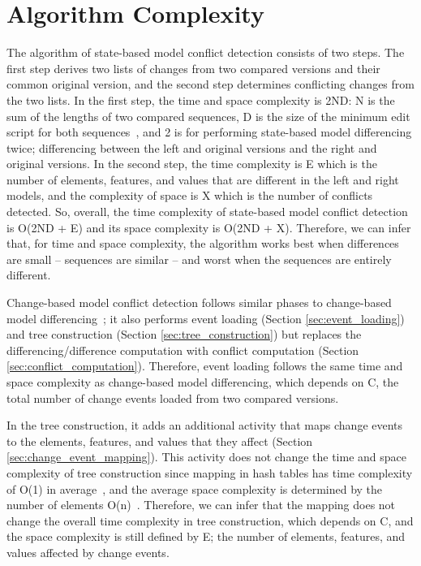 \section{Algorithm Complexity}
\label{sec:conflict_algorithm_complexity}
The algorithm of state-based model conflict detection consists of two steps. The first step derives two lists of changes from two compared versions and their common original version, and the second step determines conflicting changes from the two lists. In the first step, the time and space complexity is \textsf{2ND}: \textsf{N} is the sum of the lengths of two compared sequences, \textsf{D} is the size of the minimum edit script for both sequences~\cite{DBLP:journals/algorithmica/Meyers86}, and \textsf{2} is for performing state-based model differencing twice; differencing between the left and original versions and the right and original versions. In the second step, the time complexity is \textsf{E} which is the number of elements, features, and values that are different in the left and right models, and the complexity of space is \textsf{X} which is the number of conflicts detected. So, overall, the time complexity of state-based model conflict detection is \textsf{O}(\textsf{2ND} + \textsf{E}) and its space complexity is \textsf{O}(\textsf{2ND} + \textsf{X)}. Therefore, we can infer that, for time and space complexity, the algorithm works best when differences are small -- sequences are similar -- and worst when the sequences are entirely different.

Change-based model conflict detection follows similar phases to change-based model differencing~\cite{yohannis2019efficient}; it also performs event loading (Section \ref{sec:event_loading}) and tree construction (Section \ref{sec:tree_construction}) but replaces the differencing/difference computation with conflict computation (Section \ref{sec:conflict_computation}). Therefore, event loading follows the same time and space complexity as change-based model differencing, which depends on \textsf{C}, the total number of change events loaded from two compared versions. 

In the tree construction, it adds an additional activity that maps change events to the elements, features, and values that they affect (Section \ref{sec:change_event_mapping}). This activity does not change the time and space complexity of tree construction since mapping in hash tables has time complexity of \textsf{O}(\textsf{1}) in average~\cite{cormen2009introduction}, and the average space complexity is determined by the number of elements \textsf{O}(\textsf{n})~\cite{cormen2009introduction}. Therefore, we can infer that the mapping does not change the overall time complexity in tree construction, which depends on \textsf{C}, and the space complexity is still defined by \textsf{E}; the number of elements, features, and values affected by change events.  

